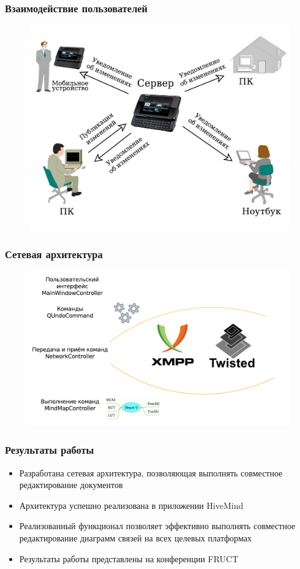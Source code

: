 \documentclass[unicode]{beamer}
\begin{document}
\begin{frame}
\transwipe[direction=90]
\frametitle{Взаимодействие пользователей}
\begin{figure}[h!] 
\centering
\includegraphics[width=\linewidth]{users_collaboration_example} 
\end{figure}
\end{frame}

\begin{frame}
\transwipe[direction=90]
\frametitle{Сетевая архитектура}
\begin{figure}[h!] 
\centering
\includegraphics[width=\linewidth]{application-layers+network} 
\end{figure}
\end{frame}

\begin{frame}
\transwipe[direction=90]
\frametitle{Результаты работы}
\begin{itemize}
  \item Разработана сетевая архитектура, позволяющая выполнять совместное
  редактирование документов
  \item Архитектура успешно реализована в приложении HiveMind
  \item Реализованный функционал позволяет эффективно выполнять совместное
  редактирование диаграмм связей на всех целевых платформах
  \item Результаты работы представлены на конференции FRUCT
\end{itemize}
\end{frame}
\end{document}
